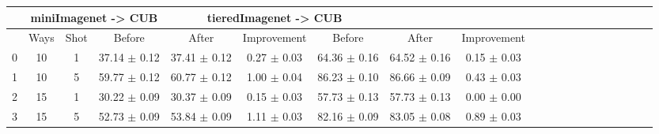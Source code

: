 \begin{tabular}{|c|c|c|c|c|c|c|c|c|c|c|c|c|c|c|c|c|c|c|c}
\toprule
{} & \multicolumn{3}{c|}{miniImagenet -> CUB} & \multicolumn{3}{c|}{tieredImagenet -> CUB} \\\midrule
{} & Ways & Shot &              Before &           After &    Improvement &                Before &           After &    Improvement \\\midrule
\midrule
0 &   10 &    1 &      37.14 $\pm$ 0.12 &  37.41 $\pm$ 0.12 &  0.27 $\pm$ 0.03 &        64.36 $\pm$ 0.16 &  64.52 $\pm$ 0.16 &  0.15 $\pm$ 0.03 \\\midrule
1 &   10 &    5 &      59.77 $\pm$ 0.12 &  60.77 $\pm$ 0.12 &  1.00 $\pm$ 0.04 &        86.23 $\pm$ 0.10 &  86.66 $\pm$ 0.09 &  0.43 $\pm$ 0.03 \\\midrule
2 &   15 &    1 &      30.22 $\pm$ 0.09 &  30.37 $\pm$ 0.09 &  0.15 $\pm$ 0.03 &        57.73 $\pm$ 0.13 &  57.73 $\pm$ 0.13 &  0.00 $\pm$ 0.00 \\\midrule
3 &   15 &    5 &      52.73 $\pm$ 0.09 &  53.84 $\pm$ 0.09 &  1.11 $\pm$ 0.03 &        82.16 $\pm$ 0.09 &  83.05 $\pm$ 0.08 &  0.89 $\pm$ 0.03 \\\midrule
\bottomrule
\end{tabular}

